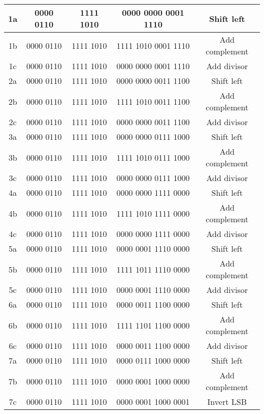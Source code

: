 \documentclass[12pt]{article}
\begin{document}
\begin{enumerate}
\begin{enumerate}
\begin{center}
\begin{tabular}{|c|c|c|c|c|}
        1a & 0000 0110 & 1111 1010 & 0000 0000 0001 1110 & Shift left \\
        \hline
        1b & 0000 0110 & 1111 1010 & 1111 1010 0001 1110 & Add complement \\
        \hline
        1c & 0000 0110 & 1111 1010 & 0000 0000 0001 1110 & Add divisor \\
        \hline

        2a & 0000 0110 & 1111 1010 & 0000 0000 0011 1100 & Shift left \\
        \hline
        2b & 0000 0110 & 1111 1010 & 1111 1010 0011 1100 & Add complement \\
        \hline
        2c & 0000 0110 & 1111 1010 & 0000 0000 0011 1100 & Add divisor \\
        \hline

        3a & 0000 0110 & 1111 1010 & 0000 0000 0111 1000 & Shift left \\
        \hline
        3b & 0000 0110 & 1111 1010 & 1111 1010 0111 1000 & Add complement \\
        \hline
        3c & 0000 0110 & 1111 1010 & 0000 0000 0111 1000 & Add divisor \\
        \hline

        4a & 0000 0110 & 1111 1010 & 0000 0000 1111 0000 & Shift left \\
        \hline
        4b & 0000 0110 & 1111 1010 & 1111 1010 1111 0000 & Add complement \\
        \hline
        4c & 0000 0110 & 1111 1010 & 0000 0000 1111 0000 & Add divisor \\
        \hline

        5a & 0000 0110 & 1111 1010 & 0000 0001 1110 0000 & Shift left \\
        \hline
        5b & 0000 0110 & 1111 1010 & 1111 1011 1110 0000 & Add complement \\
        \hline
        5c & 0000 0110 & 1111 1010 & 0000 0001 1110 0000 & Add divisor \\
        \hline

        6a & 0000 0110 & 1111 1010 & 0000 0011 1100 0000 & Shift left \\
        \hline
        6b & 0000 0110 & 1111 1010 & 1111 1101 1100 0000 & Add complement \\
        \hline
        6c & 0000 0110 & 1111 1010 & 0000 0011 1100 0000 & Add divisor \\
        \hline

        7a & 0000 0110 & 1111 1010 & 0000 0111 1000 0000 & Shift left \\
        \hline
        7b & 0000 0110 & 1111 1010 & 0000 0001 1000 0000 & Add complement \\
        \hline
        7c & 0000 0110 & 1111 1010 & 0000 0001 1000 0001 & Invert LSB \\
        \hline


\end{tabular}
\end{center}
\end{enumerate}
\end{enumerate}
\end{document}
